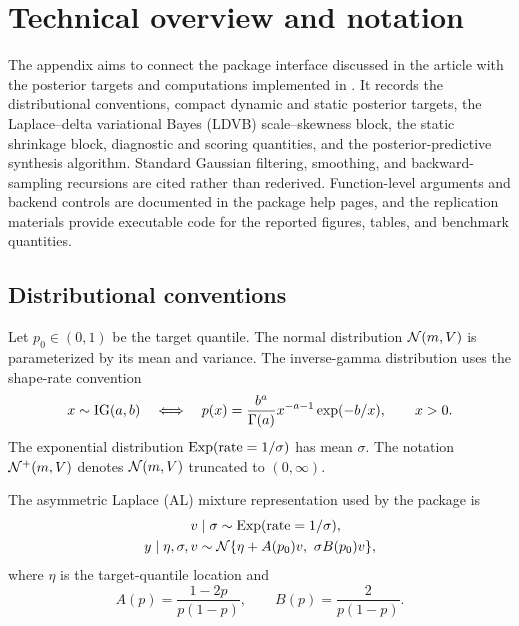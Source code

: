 
\section{Technical overview and notation}
\label{sec:app_scope}

The appendix aims to connect the package interface discussed in the article with the
posterior targets and computations implemented in . It records the
distributional conventions, compact dynamic and static posterior targets, the
Laplace--delta variational Bayes (LDVB) scale--skewness block, the static
 shrinkage block, diagnostic and scoring quantities, and the
posterior-predictive synthesis algorithm. Standard Gaussian filtering,
smoothing, and backward-sampling recursions are cited rather than rederived.
Function-level arguments and backend controls are documented in the package
help pages, and the replication materials provide executable code for the
reported figures, tables, and benchmark quantities.

\subsection{Distributional conventions}
\label{sec:app_distributional_conventions}

Let $p_0\in(0,1)$ be the target quantile. The normal distribution
$\mathcal{N}(m,V)$ is parameterized by its mean and variance. The inverse-gamma
distribution uses the shape-rate convention
\begin{equation}
x\sim\operatorname{IG}(a,b)
\quad\Longleftrightarrow\quad
p(x)=\frac{b^a}{\Gamma(a)}x^{-a-1}\exp(-b/x),\qquad x>0.
\end{equation}
The exponential distribution $\operatorname{Exp}(\text{rate}=1/\sigma)$ has mean $\sigma$.
The notation $\mathcal{N}^{+}(m,V)$ denotes $\mathcal{N}(m,V)$ truncated to $(0,\infty)$.

The asymmetric Laplace (AL) mixture representation used by the package is
\begin{align}
v &\mid \sigma \sim \operatorname{Exp}(\text{rate}=1/\sigma),\\
y \mid \eta,\sigma,v
&\sim \mathcal{N}\{ \eta + A(p_0)v,\ \sigma B(p_0)v \},
\end{align}
where $\eta$ is the target-quantile location and
\begin{equation}
A(p)=\frac{1-2p}{p(1-p)}, \qquad B(p)=\frac{2}{p(1-p)}.
\label{eq:al_AB}
\end{equation}

